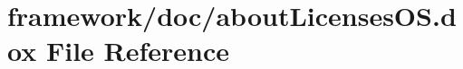 \hypertarget{about_licenses_o_s_8dox}{}\section{framework/doc/about\+Licenses\+OS.dox File Reference}
\label{about_licenses_o_s_8dox}
